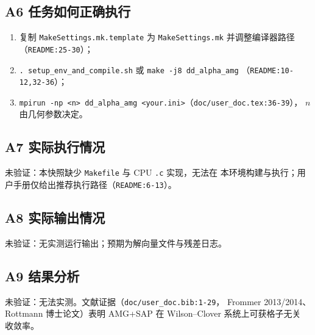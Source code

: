 \documentclass[UTF8]{ctexart}
\begin{document}
\subsection{A6 任务如何正确执行}
\begin{enumerate}
  \item 复制 \texttt{MakeSettings.mk.template} 为 \texttt{MakeSettings.mk} 并调整编译器路径
        （\texttt{README:25-30}）；
  \item \texttt{. setup\_env\_and\_compile.sh} 或 \texttt{make -j8 dd\_alpha\_amg}
        （\texttt{README:10-12,32-36}）；
  \item \texttt{mpirun -np <n> dd\_alpha\_amg <your.ini>}（\texttt{doc/user\_doc.tex:36-39}），
        $n$ 由几何参数决定。
\end{enumerate}

\subsection{A7 实际执行情况}
\textcolor{warn}{未验证}：本快照缺少 \texttt{Makefile} 与 CPU \texttt{.c} 实现，无法在
本环境构建与执行；用户手册仅给出推荐执行路径（\texttt{README:6-13}）。

\subsection{A8 实际输出情况}
\textcolor{warn}{未验证}：无实测运行输出；预期为解向量文件与残差日志。

\subsection{A9 结果分析}
\textcolor{warn}{未验证}：无法实测。文献证据（\texttt{doc/user\_doc.bib:1-29}，
Frommer 2013/2014、Rottmann 博士论文）表明 AMG+SAP 在 Wilson--Clover 系统上可获格子无关
收敛率。
\end{document}
